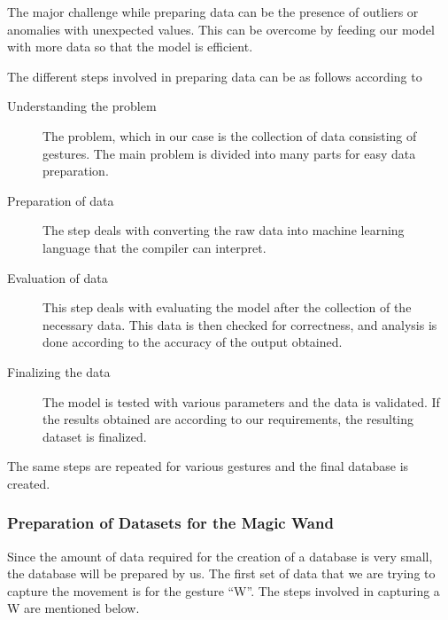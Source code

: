 	The major challenge while preparing data can be the presence of outliers or anomalies with unexpected values. This can be overcome by feeding our model with more data so that the model is efficient.\cite{War:2020}

	The different steps involved in preparing data can be as follows according to \cite{War:2020}

\begin{description}
	\item[Understanding the problem]  The problem, which in our case is the collection of data consisting of gestures. The main problem is divided into many parts for easy data preparation.
	\item[Preparation of data] The step deals with converting the raw data into machine learning language that the compiler can interpret.
	\item[Evaluation of data] This step deals with evaluating the model after the collection of the necessary data. This data is then checked for correctness, and analysis is done according to the accuracy of the output obtained. 
	\item[Finalizing the data] The model is tested with various parameters and the data is validated. If the results obtained are according to our requirements, the resulting dataset is finalized.
\end{description}

	The same steps are repeated for various gestures and the final database is created.

\subsubsection{Preparation of Datasets for the Magic Wand}

	Since the amount of data required for the creation of a database is very small, the database will be prepared by us. The first set of data that we are trying to capture the movement is for the gesture ``W''. The steps involved in capturing a W are mentioned below. \cite{War:2020}


